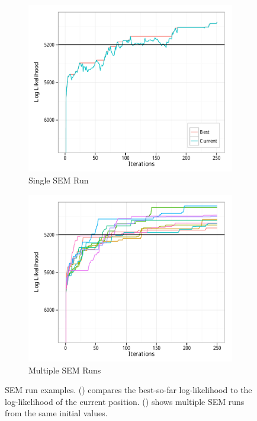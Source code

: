 \documentclass{article}
\theoremstyle{definition}
\theoremstyle{algodesc}
\begin{document}
\begin{figure}[htb] \centering
  \begin{subfigure}[t]{.45\linewidth}
    \includegraphics[width=\linewidth]{include/sa_singlerun.pdf}
    \caption{Single SEM Run} \label{fig:sa_singlerun}
  \end{subfigure}
  \begin{subfigure}[t]{.45\linewidth}
    \includegraphics[width=\linewidth]{include/sa992.pdf}
    \caption{Multiple SEM Runs} \label{fig:sa_multrun}
  \end{subfigure}
  \caption{SEM run examples. () compares the best-so-far log-likelihood to the log-likelihood of the current position. () shows multiple SEM runs from the same initial values.}
  \label{fig:sa}
\end{figure}
\end{document}
